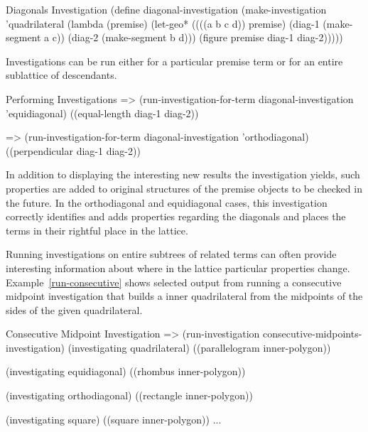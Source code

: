 \begin{code-example}
[label=diag-investigation]
{Diagonals Investigation}
(define diagonal-investigation
  (make-investigation
   'quadrilateral
   (lambda (premise)
     (let-geo*
         ((((a b c d)) premise)
          (diag-1 (make-segment a c))
          (diag-2 (make-segment b d)))
       (figure premise diag-1 diag-2)))))
\end{code-example}

Investigations can be run either for a particular premise term or for
an entire sublattice of descendants.

\begin{repl-example}
[label=run-investigation]
{Performing Investigations}
=> (run-investigation-for-term diagonal-investigation 'equidiagonal)
((equal-length diag-1 diag-2))

=> (run-investigation-for-term diagonal-investigation 'orthodiagonal)
((perpendicular diag-1 diag-2))
\end{repl-example}

In addition to displaying the interesting new results the
investigation yields, such properties are added to original structures
of the premise objects to be checked in the future. In the
orthodiagonal and equidiagonal cases, this investigation correctly
identifies and adds properties regarding the diagonals and places the
terms in their rightful place in the lattice.

Running investigations on entire subtrees of related terms can often
provide interesting information about where in the lattice particular
properties change. Example~\ref{run-consecutive} shows selected output
from running a consecutive midpoint investigation that builds a inner
quadrilateral from the midpoints of the sides of the given
quadrilateral.

\begin{repl-example}
[label=run-consecutive]
{Consecutive Midpoint Investigation \protect{}}
=> (run-investigation consecutive-midpoints-investigation)
(investigating quadrilateral)
   ((parallelogram inner-polygon))

(investigating equidiagonal)
   ((rhombus inner-polygon))

(investigating orthodiagonal)
   ((rectangle inner-polygon))

(investigating square)
   ((square inner-polygon))
...
\end{repl-example}

